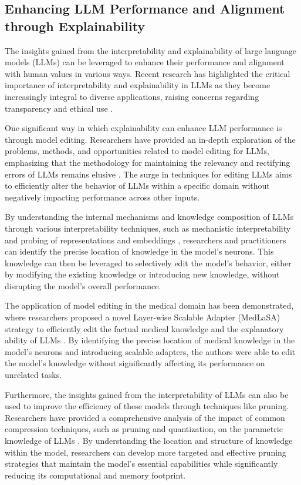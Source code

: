 \documentclass[11pt]{article}
\begin{document}
\subsection{Enhancing LLM Performance and Alignment through Explainability}

The insights gained from the interpretability and explainability of large language models (LLMs) can be leveraged to enhance their performance and alignment with human values in various ways. Recent research has highlighted the critical importance of interpretability and explainability in LLMs as they become increasingly integral to diverse applications, raising concerns regarding transparency and ethical use \cite{ref263}.

One significant way in which explainability can enhance LLM performance is through model editing. Researchers have provided an in-depth exploration of the problems, methods, and opportunities related to model editing for LLMs, emphasizing that the methodology for maintaining the relevancy and rectifying errors of LLMs remains elusive \cite{ref264}. The surge in techniques for editing LLMs aims to efficiently alter the behavior of LLMs within a specific domain without negatively impacting performance across other inputs.

By understanding the internal mechanisms and knowledge composition of LLMs through various interpretability techniques, such as mechanistic interpretability and probing of representations and embeddings \cite{ref237}, researchers and practitioners can identify the precise location of knowledge in the model's neurons. This knowledge can then be leveraged to selectively edit the model's behavior, either by modifying the existing knowledge or introducing new knowledge, without disrupting the model's overall performance.

The application of model editing in the medical domain has been demonstrated, where researchers proposed a novel Layer-wise Scalable Adapter (MedLaSA) strategy to efficiently edit the factual medical knowledge and the explanatory ability of LLMs \cite{ref265}. By identifying the precise location of medical knowledge in the model's neurons and introducing scalable adapters, the authors were able to edit the model's knowledge without significantly affecting its performance on unrelated tasks.

Furthermore, the insights gained from the interpretability of LLMs can also be used to improve the efficiency of these models through techniques like pruning. Researchers have provided a comprehensive analysis of the impact of common compression techniques, such as pruning and quantization, on the parametric knowledge of LLMs \cite{ref266}. By understanding the location and structure of knowledge within the model, researchers can develop more targeted and effective pruning strategies that maintain the model's essential capabilities while significantly reducing its computational and memory footprint.
\end{document}
